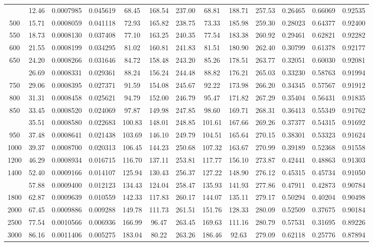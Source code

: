 \documentclass[12pt,a3paper]{article}
\begin{document}
\begin{enumerate}
\begin{center}
\begin{longtable}{c c c c c c c c c c c c c}
\addlinespace
450 & 12.46 & 0.0007985 & 0.045619 & 68.45 & 168.54 & 237.00 & 68.81 & 188.71 & 257.53 & 0.26465 & 0.66069 & 0.92535 \\
500 & 15.71 & 0.0008059 & 0.041118 & 72.93 & 165.82 & 238.75 & 73.33 & 185.98 & 259.30 & 0.28023 & 0.64377 & 0.92400 \\
550 & 18.73 & 0.0008130 & 0.037408 & 77.10 & 163.25 & 240.35 & 77.54 & 183.38 & 260.92 & 0.29461 & 0.62821 & 0.92282 \\
600 & 21.55 & 0.0008199 & 0.034295 & 81.02 & 160.81 & 241.83 & 81.51 & 180.90 & 262.40 & 0.30799 & 0.61378 & 0.92177 \\
650 & 24.20 & 0.0008266 & 0.031646 & 84.72 & 158.48 & 243.20 & 85.26 & 178.51 & 263.77 & 0.32051 & 0.60030 & 0.92081 \\
\addlinespace
700 & 26.69 & 0.0008331 & 0.029361 & 88.24 & 156.24 & 244.48 & 88.82 & 176.21 & 265.03 & 0.33230 & 0.58763 & 0.91994 \\
750 & 29.06 & 0.0008395 & 0.027371 & 91.59 & 154.08 & 245.67 & 92.22 & 173.98 & 266.20 & 0.34345 & 0.57567 & 0.91912 \\
800 & 31.31 & 0.0008458 & 0.025621 & 94.79 & 152.00 & 246.79 & 95.47 & 171.82 & 267.29 & 0.35404 & 0.56431 & 0.91835 \\
850 & 33.45 & 0.0008520 & 0.024069 & 97.87 & 149.98 & 247.85 & 98.60 & 169.71 & 268.31 & 0.36413 & 0.55349 & 0.91762 \\
\addlinespace
900 & 35.51 & 0.0008580 & 0.022683 & 100.83 & 148.01 & 248.85 & 101.61 & 167.66 & 269.26 & 0.37377 & 0.54315 & 0.91692 \\
950 & 37.48 & 0.0008641 & 0.021438 & 103.69 & 146.10 & 249.79 & 104.51 & 165.64 & 270.15 & 0.38301 & 0.53323 & 0.91624 \\
1000 & 39.37 & 0.0008700 & 0.020313 & 106.45 & 144.23 & 250.68 & 107.32 & 163.67 & 270.99 & 0.39189 & 0.52368 & 0.91558 \\
1200 & 46.29 & 0.0008934 & 0.016715 & 116.70 & 137.11 & 253.81 & 117.77 & 156.10 & 273.87 & 0.42441 & 0.48863 & 0.91303 \\
1400 & 52.40 & 0.0009166 & 0.014107 & 125.94 & 130.43 & 256.37 & 127.22 & 148.90 & 276.12 & 0.45315 & 0.45734 & 0.91050 \\
\addlinespace
1600 & 57.88 & 0.0009400 & 0.012123 & 134.43 & 124.04 & 258.47 & 135.93 & 141.93 & 277.86 & 0.47911 & 0.42873 & 0.90784 \\
1800 & 62.87 & 0.0009639 & 0.010559 & 142.33 & 117.83 & 260.17 & 144.07 & 135.11 & 279.17 & 0.50294 & 0.40204 & 0.90498 \\
2000 & 67.45 & 0.0009886 & 0.009288 & 149.78 & 111.73 & 261.51 & 151.76 & 128.33 & 280.09 & 0.52509 & 0.37675 & 0.90184 \\
2500 & 77.54 & 0.0010566 & 0.006936 & 166.99 & 96.47 & 263.45 & 169.63 & 111.16 & 280.79 & 0.57531 & 0.31695 & 0.89226 \\
3000 & 86.16 & 0.0011406 & 0.005275 & 183.04 & 80.22 & 263.26 & 186.46 & 92.63 & 279.09 & 0.62118 & 0.25776 & 0.87894 \\
\end{longtable}
\end{center}


\end{enumerate}
\end{document}
